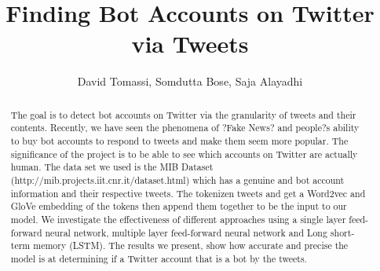 \documentclass[a4paper,12pt]{article}
\title{Finding Bot Accounts on Twitter via Tweets}
\author{David Tomassi, Somdutta Bose, Saja Alayadhi}
\begin{document}
\maketitle

\begin{abstract}
The goal is to detect bot accounts on Twitter via the granularity of tweets and their contents. Recently, we have seen the phenomena of ?Fake News? and people?s ability to buy bot accounts to respond to tweets and make them seem more popular. The significance of the project is to be able to see which accounts on Twitter are actually human. The data set we used is the MIB Dataset (http://mib.projects.iit.cnr.it/dataset.html) which has a genuine and bot account information and their respective tweets. The tokenizen tweets and get a Word2vec and GloVe embedding of the tokens then append them together to be the input to our model. We investigate the effectiveness of different approaches using a single layer feed-forward neural network, multiple layer feed-forward neural network and Long short-term memory (LSTM). The results we present, show how accurate and precise the model is at determining if a Twitter account that is a bot by the tweets.
\end{abstract}













%






\end{document}
